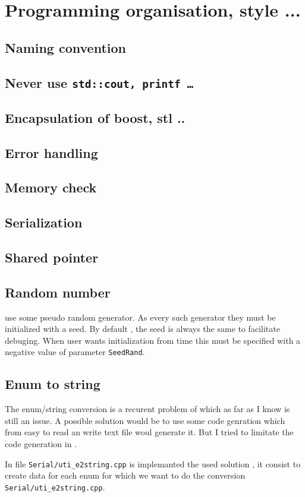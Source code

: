 
\chapter{Programming organisation, style ...}

\section{Naming convention}

\section{Never use {\tt std::cout, printf \dots}}

\section{Encapsulation of boost, stl ..}
\section{Error handling}
\section{Memory check}
\section{Serialization}
\section{Shared pointer}

\section{Random number}

\PPP use some pseudo random generator. As every such generator
they must be initialized with a seed.
By default , the seed is always the same to facilitate debuging.
When user wants initialization from time this must be specified 
with a negative value of parameter {\tt  SeedRand}.



\section{Enum to string}

The enum/string  conversion is a recurent problem of \CPP which
as far as I know is still an issue. A possible solution
would be to use some code genration which from easy to read
an write text file woul generate it. But I tried to limitate
the code generation in \PPP.

In file {\tt Serial/uti\_e2string.cpp} is implemanted 
the used solution , it consist  to create data for each enum
for which we want to do the conversion {\tt Serial/uti\_e2string.cpp}.



